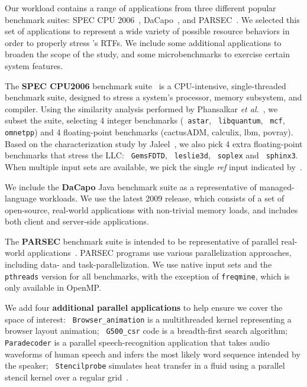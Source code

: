 Our workload contains a range of applications from three different
popular benchmark suites: SPEC CPU 2006~\cite{SPEC2006},
DaCapo~\cite{dacapo}, and PARSEC~\cite{parsec}. We selected this set of applications to represent a wide variety of possible resource behaviors in order to properly stress \pacora's RTFs. We include some additional applications to broaden the
scope of the study, and some microbenchmarks to exercise certain
system features.

The \textbf{SPEC CPU2006} benchmark suite~\cite{SPEC2006} is a
CPU-intensive, single-threaded benchmark suite, designed to stress a
system's processor, memory subsystem, and compiler.  Using the
similarity analysis performed by Phansalkar \emph{et
al.}~\cite{Phansalkar:ISCA2007}, we subset the suite, selecting 4
integer benchmarks (\texttt{ astar}, \texttt{ libquantum}, \texttt{ mcf}, \texttt{ omnetpp}) and 4
floating-point benchmarks (cactusADM, calculix, lbm, povray).  Based
on the characterization study by Jaleel~\cite{Jaleel:TR2007}, we also
pick 4 extra floating-point benchmarks that stress the LLC: \texttt{ GemsFDTD},
\texttt{ leslie3d}, \texttt{ soplex} and \texttt{ sphinx3}.  When multiple input sets are
available, we pick the single \textit{ref} input indicated by~\cite{Phansalkar:ISCA2007}.

We include the \textbf{DaCapo} Java benchmark suite as a
representative of managed-language workloads. We use the latest 2009 release, which consists of a set of open-source, real-world
applications with non-trivial memory loads, and includes both client and
server-side applications.

The \textbf{PARSEC} benchmark suite is intended to be representative
of parallel real-world applications~\cite{parsec}. PARSEC
programs use various parallelization approaches, including data- and
task-parallelization. We use native input sets and the \texttt{ pthreads} version for all benchmarks, with the exception of
\texttt{freqmine}, which is only available in OpenMP.

We add four \textbf{additional parallel applications} to help ensure
we cover the space of interest: \texttt{ Browser\_animation} is a
multithreaded kernel representing a browser layout animation; \texttt{
  G500\_csr} code is a breadth-first search algorithm; \texttt{ Paradecoder} is a parallel
speech-recognition application that takes audio waveforms of human
speech and infers the most likely word sequence intended by the
speaker; \texttt{ Stencilprobe} simulates heat transfer in a fluid
using a parallel stencil kernel over a regular
grid~\cite{Kamil:Stencilprobe}.

